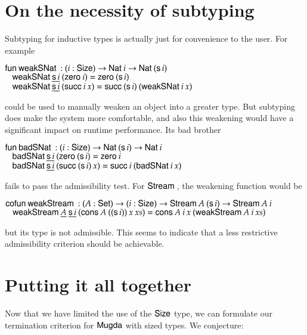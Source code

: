 \section{On the necessity of subtyping}
Subtyping for inductive types is actually just for convenience to the user. 
For example
\begin{bsp}
$\mathsf{fun}\: \mathsf{weakSNat}\: : (i : \mathsf{Size} ) \rightarrow \mathsf{Nat}\: i \rightarrow \mathsf{Nat}\: (\mathsf{s}\, i)$\\
$\hspace*{3mm} \mathsf{weakSNat}\: \underline{\mathsf{s}\, i} \: (\mathsf{zero}\: i) = \mathsf{zero}\: (\mathsf{s}\, i)$\\
$\hspace*{3mm} \mathsf{weakSNat}\: \underline{\mathsf{s}\, i} \: (\mathsf{succ}\: i \: x) = \mathsf{succ}\: (\mathsf{s}\, i) \: (\mathsf{weakSNat}\: i \: x) $
\end{bsp}
could be used to manually weaken an object into a greater type.
But subtyping does make the system more comfortable, and also this weakening would have
a significant impact on runtime performance.
Its bad brother 
\begin{bsp}
$\mathsf{fun}\: \mathsf{badSNat}\: : (i : \mathsf{Size} ) \rightarrow \mathsf{Nat}\: (\mathsf{s}\, i) \rightarrow \mathsf{Nat}\: i$\\
$\hspace*{3mm} \mathsf{badSNat}\: \underline{\mathsf{s}\, i} \: (\mathsf{zero}\: (\mathsf{s}\, i) = \mathsf{zero}\: i$\\
$\hspace*{3mm} \mathsf{badSNat}\: \underline{\mathsf{s}\, i} \: (\mathsf{succ}\: (\mathsf{s}\, i) \: x) = \mathsf{succ}\: i \: (\mathsf{badSNat}\: i \: x) $
\end{bsp}
fails to pass the admissibility test. 
For $\mathsf{Stream}\:$, the weakening function would be
\begin{bsp}
$\mathsf{cofun}\: \mathsf{weakStream}\: : ( A : \mathsf{Set} ) \rightarrow (i : \mathsf{Size} ) \rightarrow \mathsf{Stream}\: A \: (\mathsf{s}\, i) \rightarrow \mathsf{Stream}\: A \: i$\\
$\hspace*{3mm} \mathsf{weakStream}\: \underline{A} \: \underline{\mathsf{s}\, i} \: (\mathsf{cons}\: A \: ((\mathsf{s}\, i)) \: x \: xs) = \mathsf{cons}\: A \: i \: x \: (\mathsf{weakStream}\: A \: i \: xs) $
\end{bsp}
but its type is not admissible. This seems to indicate that a less restrictive admissibility criterion should be achievable.

\section{Putting it all together}
Now that we have limited the use of the $\mathsf{Size}$ type, we can formulate our termination criterion for 
$\textsf{Mugda}$ with sized types. We conjecture:
